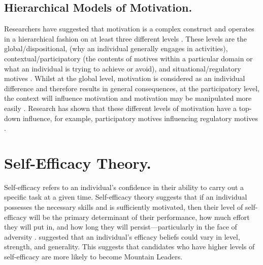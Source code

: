 \documentclass[
  12pt,
  a4paper,
]{book}
\begin{document}
\hypertarget{hierarchical-models-of-motivation.}{%
\subsection{Hierarchical Models of Motivation.}\label{hierarchical-models-of-motivation.}}

Researchers have suggested that motivation is a complex construct and operates in a hierarchical fashion on at least three different levels \citep{Ingledew2009, Vallerand1997, Vallerand2002}. These levels are the global/dispositional, (why an individual generally engages in activities), contextual/participatory (the contents of motives within a particular domain or what an individual is trying to achieve or avoid), and situational/regulatory motives \citep[the perceived locus of causality of the behavioural goals---where the motive sits on the relative autonomy continuum;][]{Deci2000, Ingledew2009, Vallerand1997, Vallerand2002}. Whilst at the global level, motivation is considered as an individual difference and therefore results in general consequences, at the participatory level, the context will influence motivation and motivation may be manipulated more easily \citep{Vallerand2002}. \citet{Ingledew2009} Research has shown that these different levels of motivation have a top-down influence, for example, participatory motives influencing regulatory motives \citep{Ingledew2009}.

\hypertarget{gen-intro-self-efficacy}{%
\section{Self-Efficacy Theory.}\label{gen-intro-self-efficacy}}

Self-efficacy refers to an individual's confidence in their ability to carry out a specific task at a given time. Self-efficacy theory suggests that if an individual possesses the necessary skills and is sufficiently motivated, then their level of self-efficacy will be the primary determinant of their performance, how much effort they will put in, and how long they will persist---particularly in the face of adversity \citep{Bandura1977, Bandura1982, Bandura1997}. \citet{Bandura1977} suggested that an individual's efficacy beliefs could vary in level, strength, and generality. This suggests that candidates who have higher levels of self-efficacy are more likely to become Mountain Leaders.
\end{document}

